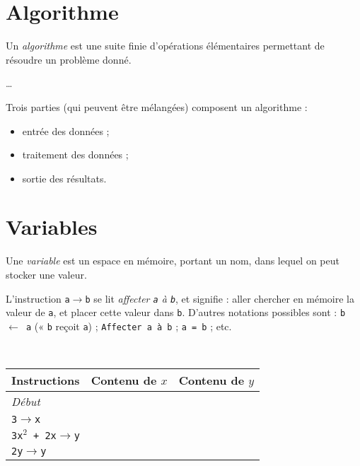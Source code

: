 \section{Algorithme}

\begin{definition}
  Un \emph{algorithme} est une suite finie d'opérations élémentaires permettant
  de résoudre un problème donné.
\end{definition}

\begin{exemple}
  \ldots
\end{exemple}

Trois parties (qui peuvent être mélangées) composent un algorithme :
\begin{itemize}
  \item entrée des données ;
  \item traitement des données ;
  \item sortie des résultats.
\end{itemize}

\section{Variables}

\begin{definition}
  Une \emph{variable} est un espace en mémoire, portant un nom, dans lequel on
  peut stocker une valeur.
\end{definition}

L'instruction \texttt{a$\rightarrow$b} se lit \emph{affecter \texttt{a} à
\texttt{b}}, et signifie : aller chercher en mémoire la valeur de \verb+a+, et
placer cette valeur dans \verb+b+. D'autres notations possibles sont :
  \texttt{b $\leftarrow$ a} (« \verb+b+ reçoit \verb+a+) ;
  \texttt{Affecter a à b} ;
  \texttt{a = b} ;
  etc.


\begin{exemple}~
  \begin{center}
  \begin{tabular}{p{8em}|cc}
    Instructions & Contenu de $x$ & Contenu de $y$ \\
    \hline
    \emph{Début} &   &   \\
    \texttt{3$\rightarrow$x} &   &  \\
    \texttt{3x$^2$ + 2x$\rightarrow$y} &   & \\
    \texttt{2y$\rightarrow$y} & &
  \end{tabular}
\end{center}
\end{exemple}

